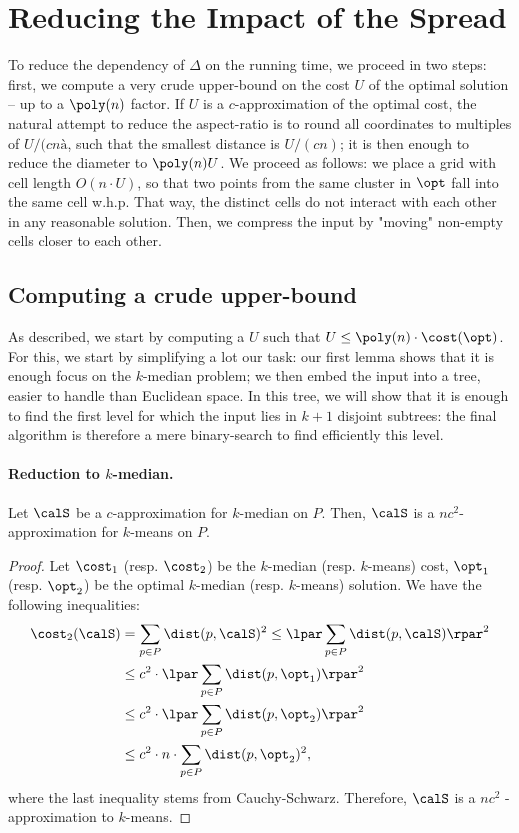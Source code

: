 \section{Reducing the Impact of the Spread}
To reduce the dependency of $\Delta$ on the running time, we proceed in two steps: first, we compute a very crude upper-bound on the cost $U$ of the optimal solution -- up to a $\poly(n)$ factor. 
If $U$ is a $c$-approximation of the optimal cost, the natural attempt to reduce the aspect-ratio is to round all coordinates to multiples of $U/(cnà$, such that the smallest distance is $U/(cn)$; it is then enough to reduce the diameter to $\poly(n) U$. We proceed as follows: we place a grid with cell length $O(n \cdot U)$, so that two points from the same cluster in $\opt$ fall into the same cell w.h.p. That way, the distinct cells do not interact with each other in any reasonable solution. 
Then, we compress the input by "moving" non-empty cells closer to each other.

\subsection{Computing a crude upper-bound}
As described, we start by computing a $U$ such that $U \leq \poly(n) \cdot \cost(\opt)$. For this, we start by simplifying a lot our task: our first lemma shows that it is enough focus on the $k$-median problem; we then embed the input into a tree, easier to handle than Euclidean space. In this tree, we will show that it is enough to find the first level for which the input lies in $k+1$ disjoint subtrees: the final algorithm is therefore a mere binary-search to find efficiently this level.

\paragraph{Reduction to $k$-median.}

\begin{lemma}
Let $\calS$ be a $c$-approximation for $k$-median on $P$. Then, $\calS$ is a $nc^2$-approximation for $k$-means on $P$.
\end{lemma}
\begin{proof}
Let $\cost_1$ (resp. $\cost_2$) be the $k$-median (resp. $k$-means) cost, $\opt_1$ (resp. $\opt_2$) be the optimal $k$-median (resp. $k$-means) solution. We have the following inequalities:
\begin{align*}
\cost_2(\calS) &= \sum_{p\in P} \dist(p, \calS)^2 \leq \lpar \sum_{p\in P} \dist(p, \calS)\rpar^2\\
&\leq c^2 \cdot \lpar  \sum_{p\in P} \dist(p, \opt_1)\rpar^2\\
&\leq c^2 \cdot \lpar  \sum_{p\in P} \dist(p, \opt_2)\rpar^2\\
&\leq c^2 \cdot n \cdot  \sum_{p\in P} \dist(p, \opt_2)^2,
\end{align*}
where the last inequality stems from Cauchy-Schwarz. Therefore, $\calS$ is a $nc^2$ - approximation to $k$-means. 
\end{proof}

